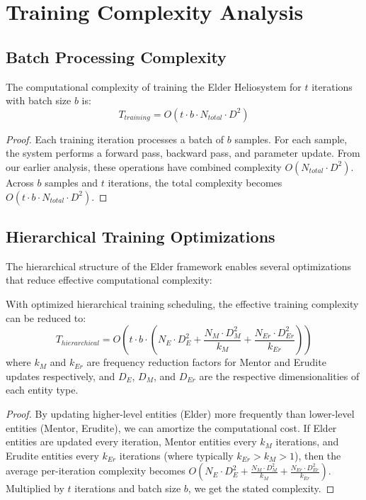 \section{Training Complexity Analysis}

\subsection{Batch Processing Complexity}

\begin{theorem}
The computational complexity of training the Elder Heliosystem for $t$ iterations with batch size $b$ is:
\begin{equation}
T_{training} = O(t \cdot b \cdot N_{total} \cdot D^2)
\end{equation}
\end{theorem}

\begin{proof}
Each training iteration processes a batch of $b$ samples. For each sample, the system performs a forward pass, backward pass, and parameter update. From our earlier analysis, these operations have combined complexity $O(N_{total} \cdot D^2)$. Across $b$ samples and $t$ iterations, the total complexity becomes $O(t \cdot b \cdot N_{total} \cdot D^2)$.
\end{proof}

\subsection{Hierarchical Training Optimizations}

The hierarchical structure of the Elder framework enables several optimizations that reduce effective computational complexity:

\begin{theorem}
With optimized hierarchical training scheduling, the effective training complexity can be reduced to:
\begin{equation}
T_{hierarchical} = O(t \cdot b \cdot (N_E \cdot D_E^2 + \frac{N_M \cdot D_M^2}{k_M} + \frac{N_{Er} \cdot D_{Er}^2}{k_{Er}}))
\end{equation}
where $k_M$ and $k_{Er}$ are frequency reduction factors for Mentor and Erudite updates respectively, and $D_E$, $D_M$, and $D_{Er}$ are the respective dimensionalities of each entity type.
\end{theorem}

\begin{proof}
By updating higher-level entities (Elder) more frequently than lower-level entities (Mentor, Erudite), we can amortize the computational cost. If Elder entities are updated every iteration, Mentor entities every $k_M$ iterations, and Erudite entities every $k_{Er}$ iterations (where typically $k_{Er} > k_M > 1$), then the average per-iteration complexity becomes $O(N_E \cdot D_E^2 + \frac{N_M \cdot D_M^2}{k_M} + \frac{N_{Er} \cdot D_{Er}^2}{k_{Er}})$. Multiplied by $t$ iterations and batch size $b$, we get the stated complexity.
\end{proof}

